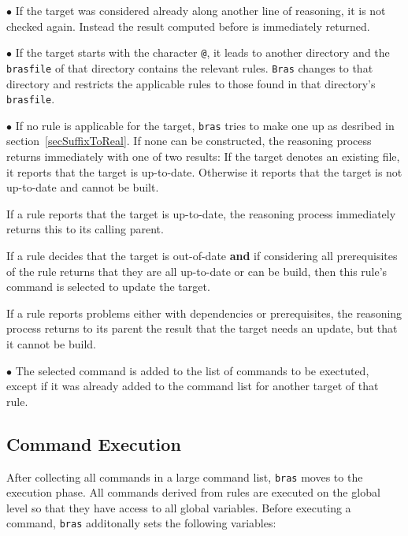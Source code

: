 \documentclass[12pt]{article}
\newcommand{\bras}{\texttt{bras}}
\newcommand{\Bras}{\texttt{Bras}}
\begin{document}
$\bullet$ If the target was considered already along another line of
reasoning, it is not checked again. Instead the result computed before
is immediately returned.

$\bullet$ If the target starts with the character \texttt{@}, it leads
to another directory and the \texttt{brasfile} of that directory
contains the relevant rules. \Bras{} changes to that
directory and restricts the applicable rules to those found in that
directory's \texttt{brasfile}.

$\bullet$ If no rule is applicable for the target, \bras{} tries to
make one up as desribed in section~\ref{secSuffixToReal}. If none can be
constructed, the reasoning process returns immediately with one of two
results: If the target denotes an existing file, it reports that the
target is up-to-date. Otherwise it reports that the target is not
up-to-date and cannot be built.

If a rule reports that the target is up-to-date,
the reasoning process immediately returns this to its calling parent.

If a rule decides that the target is out-of-date \textbf{and} if
considering all prerequisites of the rule returns that they are all
up-to-date or can be build, then this rule's command is selected to
update the target.

If a rule reports problems either with dependencies or
prerequisites, the reasoning process returns to its parent the result
that the target needs an update, but that it cannot be build.

$\bullet$ The selected command is added to the list of commands to be
exectuted, except if it was already added to the command
list for another target of that rule.

\subsection{Command Execution}
\label{secCmdExec}

After collecting all commands in a large command list, \bras{} moves
to the execution phase. All commands derived from rules are executed
on the global level so that they have access to all global
variables. Before executing a command, \bras{} additonally sets the
following variables:
\end{document}
